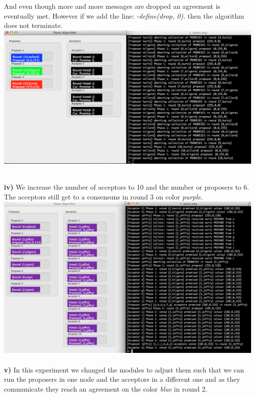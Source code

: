 \documentclass[a4paper, 11pt]{article}
\begin{document}
And even though more and more messages are dropped an agreement is eventually met. However if we add the line: \textit{-define(drop, 0).} then the algorithm does not terminate.\\

\includegraphics[scale=0.35]{images/exp7-drop0.png} \\\\
\newpage

\textbf{iv)} We increase the number of acceptors to 10 and the number or proposers to 6. The acceptors still get to a consensuns in round 3 on color \textit{purple}.\\

\includegraphics[scale=0.30]{images/exp8.png} \\\\

\textbf{v)} In this experiment we changed the modules to adjust them such that we can run the proposers in one node and the acceptors in a different one and as they communicate they reach an agreement on the color \textit{blue} in round 2.\\
\end{document}

